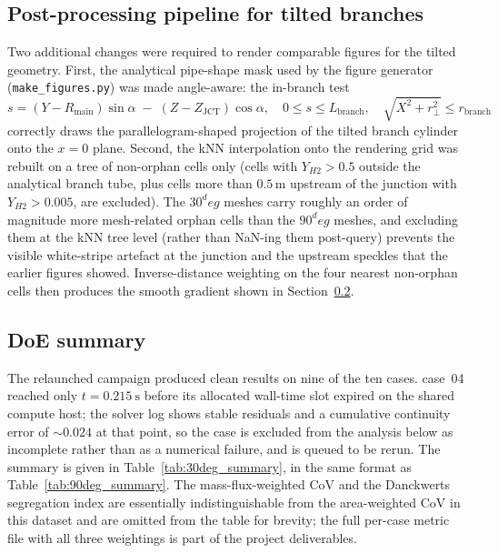 \documentclass[11pt,a4paper]{article}
\def\Hi{H2}%
\def\CoV{CoV}%
\def\circ{ deg}%
\newcommand{\Hi}{\ensuremath{\mathrm{H_2}}}
\newcommand{\CoV}{\ensuremath{\mathrm{CoV}}}
\begin{document}
\subsection{Post-processing pipeline for tilted branches}
\label{sec:30_postproc}
Two additional changes were required to render comparable figures
for the tilted geometry. First, the analytical pipe-shape mask
used by the figure generator (\texttt{make\_figures.py}) was made
angle-aware: the in-branch test
\begin{equation}
s = (Y - R_{\mathrm{main}})\sin\alpha
\;-\; (Z - Z_{\mathrm{JCT}})\cos\alpha,\quad
0 \le s \le L_{\mathrm{branch}},\quad
\sqrt{X^2 + r_\perp^2} \le r_{\mathrm{branch}}
\label{eq:branch_mask}
\end{equation}
correctly draws the parallelogram-shaped projection of the tilted
branch cylinder onto the \(x=0\) plane. Second, the kNN
interpolation onto the rendering grid was rebuilt on a tree of
non-orphan cells only (cells with \(Y_{\Hi}>0.5\) outside the
analytical branch tube, plus cells more than \(0.5\,\si{\meter}\)
upstream of the junction with \(Y_{\Hi}>0.005\), are excluded).
The \(30^\circ\) meshes carry roughly an order of magnitude more
mesh-related orphan cells than the \(90^\circ\) meshes, and excluding
them at the kNN tree level (rather than NaN-ing them post-query)
prevents the visible white-stripe artefact at the junction and the
upstream speckles that the earlier figures showed. Inverse-distance
weighting on the four nearest non-orphan cells then produces the
smooth gradient shown in Section~\ref{sec:30_doe}.

\subsection{DoE summary}
\label{sec:30_doe}
The relaunched campaign produced clean results on nine of the ten
cases. case~04 reached only \(t=\SI{0.215}{\second}\) before its
allocated wall-time slot expired on the shared compute host; the
solver log shows stable residuals and a cumulative continuity
error of \(\sim 0.024\) at that point, so the case is excluded
from the analysis below as incomplete rather than as a numerical
failure, and is queued to be rerun. The summary is given in
Table~\ref{tab:30deg_summary}, in the same format as
Table~\ref{tab:90deg_summary}. The mass-flux-weighted \CoV{} and
the Danckwerts segregation index are essentially indistinguishable
from the area-weighted \CoV{} in this dataset and are omitted from
the table for brevity; the full per-case metric file with all three
weightings is part of the project deliverables.
\end{document}
